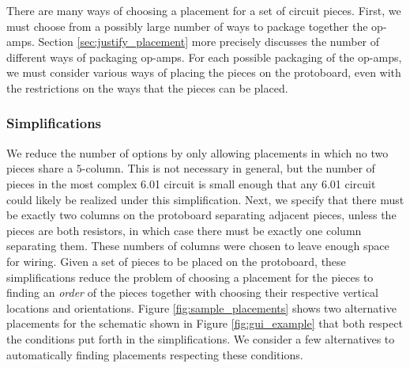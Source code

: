 There are many ways of choosing a placement for a set of circuit pieces.
First, we must choose from a possibly large number of ways
to package together the op-amps. Section \ref{sec:justify_placement} more
precisely discusses the number of different ways of packaging op-amps.
For each possible packaging of the
op-amps, we must consider various ways of placing the pieces on the protoboard,
even with the restrictions on the ways that the pieces can be placed.

\subsubsection{Simplifications}

We reduce the number of options by only allowing placements in which no
two pieces share a $5$-column. This is not necessary in general, but the
number of pieces in the most complex 6.01 circuit is small enough that
any 6.01 circuit could likely be realized under this simplification.
Next, we specify that there must be exactly two columns on the protoboard
separating adjacent pieces, unless the pieces are both resistors, in which
case there must be exactly one column separating them. These numbers of columns
were chosen to leave enough space for wiring. Given a set of pieces to be placed
on the protoboard, these simplifications reduce the
problem of choosing a placement for the pieces to finding an \emph{order} of the
pieces together with choosing their respective vertical locations and
orientations. Figure \ref{fig:sample_placements} shows two alternative
placements for the schematic shown in Figure \ref{fig:gui_example} that both
respect the conditions put forth in the simplifications.
We consider a few alternatives to automatically finding placements respecting
these conditions.

